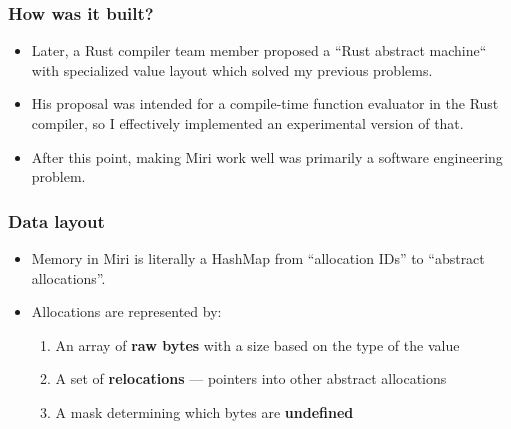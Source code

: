 \documentclass{beamer}
\begin{document}
\begin{frame}
  \frametitle{How was it built?}
  \begin{itemize}
    \item Later, a Rust compiler team member proposed a ``Rust abstract
      machine`` with specialized value layout which solved my previous problems.
      \pause

    \item His proposal was intended for a compile-time function evaluator in the
      Rust compiler, so I effectively implemented an experimental version of
      that. \pause

    \item After this point, making Miri work well was primarily a software
      engineering problem.
  \end{itemize}
\end{frame}

\begin{frame}
  \frametitle{Data layout}
  \begin{itemize}
    \item Memory in Miri is literally a HashMap from ``allocation IDs'' to
      ``abstract allocations''.

    \item Allocations are represented by: \pause
      \begin{enumerate}
        \item An array of \textbf{raw bytes} with a size based on the type of
          the value \pause
        \item A set of \textbf{relocations} --- pointers into other abstract
          allocations \pause
        \item A mask determining which bytes are \textbf{undefined}
      \end{enumerate}
  \end{itemize}
\end{frame}

\end{document}
